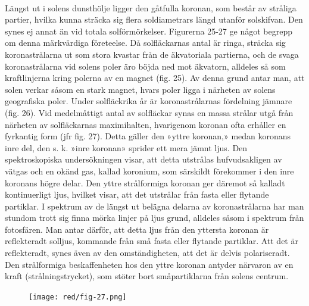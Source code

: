 \documentclass[a4paper, 12pt, oneside, swedish]{article}
\begin{document}
\paragraph{}
Längst ut i solens dunsthölje ligger den gåtfulla koronan, som består av stråliga partier, hvilka kunna sträcka sig flera soldiametrars längd utanför solskifvan. Den synes ej annat än vid totala solförmörkelser. Figurerna 25-27 ge något begrepp om denna märkvärdiga företeelse. Då solfläckarnas antal är ringa, sträcka sig koronastrålarna ut som stora kvastar från de äkvatoriala partierna, och de svaga koronastrålarna vid solens poler äro böjda ned mot äkvatorn, alldeles så som kraftlinjerna kring polerna av en magnet (fig. 25). Av denna grund antar man, att solen verkar såsom en stark magnet, hvars poler ligga i närheten av solens geografiska poler. Under solfläckrika år är koronastrålarnas fördelning jämnare (fig. 26). Vid medelmåttigt antal av solfläckar synas en massa strålar utgå från närheten av solfläckarnas maximihalten, hvarigenom koronan ofta erhåller en fyrkantig form (jfr fig. 27). Detta gäller den »yttre koronan,» medan koronans inre del, den s. k. »inre koronan» sprider ett mera jämnt ljus. Den spektroskopiska undersökningen visar, att detta utstrålas hufvudsakligen av vätgas och en okänd gas, kallad koronium, som särskildt förekommer i den inre koronans högre delar. Den yttre strålformiga koronan ger däremot så kalladt kontinuerligt ljus, hvilket visar, att det utstrålar från fasta eller flytande partiklar. I spektrum av de längst ut belägna delarna av koronastrålarna har man stundom trott sig finna mörka linjer på ljus grund, alldeles såsom i spektrum från fotosfären. Man antar därför, att detta ljus från den yttersta koronan är reflekteradt solljus, kommande från små fasta eller flytande partiklar. Att det är reflekteradt, synes även av den omständigheten, att det är delvis polariseradt. Den strålformiga beskaffenheten hos den yttre koronan antyder närvaron av en kraft (strålningstrycket), som stöter bort småpartiklarna från solens centrum.

\begin{figure}[H]
\centering
\texttt{[image: red/fig-27.png]}
\caption{}
\end{figure}
\end{document}
